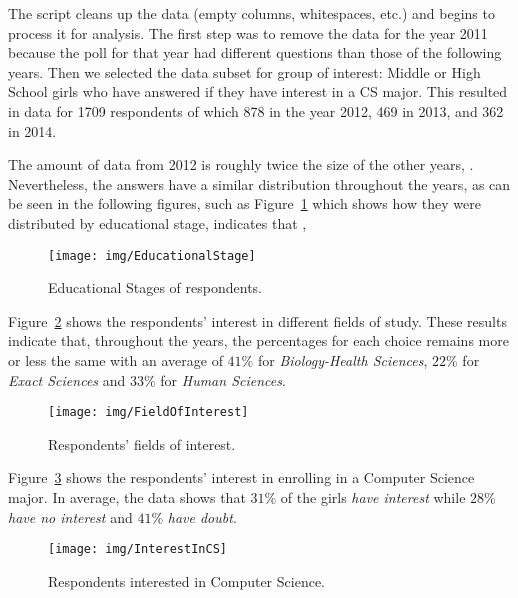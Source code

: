 The script cleans up the data (empty columns, whitespaces, etc.) and begins to process it for analysis. The first step was to remove the data for the year 2011 because the poll for that year had different questions than those of the following years. Then we selected the data subset for group of interest: Middle or High School girls who have answered if they have interest in a CS major. This resulted in data for 1709 respondents of which 878 in the year 2012, 469 in 2013, and 362 in 2014.

The amount of data from 2012 is roughly twice the size of the other years, . Nevertheless, the answers have a similar distribution throughout the years, as can be seen in the following figures, such as Figure~\ref{fig:EducationalStage} which shows how they were distributed by educational stage, indicates that ,

\begin{figure}[h!]%
\texttt{[image: img/EducationalStage]}%
\caption{Educational Stages of respondents.}%
\label{fig:EducationalStage}%
\end{figure}%

Figure~\ref{fig:FieldOfInterest} shows the respondents' interest in different fields of study. These results indicate that, throughout the years, the percentages for each choice remains more or less the same with an average of $41\%$ for \emph{Biology-Health Sciences}, $22\%$ for \emph{Exact Sciences} and $33\%$ for \emph{Human Sciences}.

\begin{figure}[h!]%
\texttt{[image: img/FieldOfInterest]}%
\caption{Respondents' fields of interest.}%
\label{fig:FieldOfInterest}%
\end{figure}%

Figure~\ref{fig:InterestInCS} shows the respondents' interest in enrolling in a Computer Science major. In average, the data shows that $31\%$ of the girls \emph{have interest} while $28\%$ \emph{have no interest} and $41\%$ \emph{have doubt}.

\begin{figure}[h!]%
\texttt{[image: img/InterestInCS]}%
\caption{Respondents interested in Computer Science.}%
\label{fig:InterestInCS}%
\end{figure}%